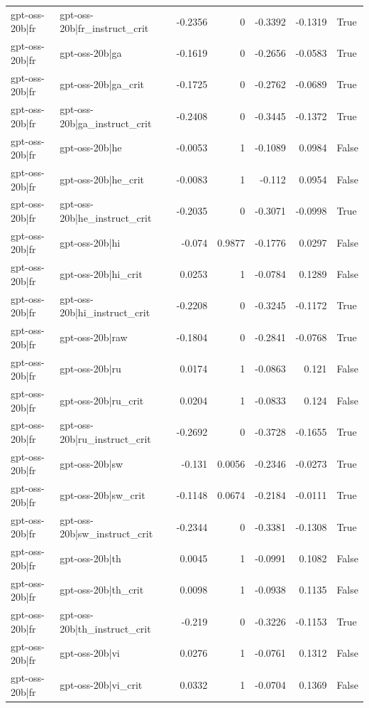 \begin{table}
\begin{tabular}{l l r r r r l}
gpt-oss-20b|fr & gpt-oss-20b|fr_instruct_crit & -0.2356 & 0 & -0.3392 & -0.1319 & True \\
gpt-oss-20b|fr & gpt-oss-20b|ga & -0.1619 & 0 & -0.2656 & -0.0583 & True \\
gpt-oss-20b|fr & gpt-oss-20b|ga_crit & -0.1725 & 0 & -0.2762 & -0.0689 & True \\
gpt-oss-20b|fr & gpt-oss-20b|ga_instruct_crit & -0.2408 & 0 & -0.3445 & -0.1372 & True \\
gpt-oss-20b|fr & gpt-oss-20b|he & -0.0053 & 1 & -0.1089 & 0.0984 & False \\
gpt-oss-20b|fr & gpt-oss-20b|he_crit & -0.0083 & 1 & -0.112 & 0.0954 & False \\
gpt-oss-20b|fr & gpt-oss-20b|he_instruct_crit & -0.2035 & 0 & -0.3071 & -0.0998 & True \\
gpt-oss-20b|fr & gpt-oss-20b|hi & -0.074 & 0.9877 & -0.1776 & 0.0297 & False \\
gpt-oss-20b|fr & gpt-oss-20b|hi_crit & 0.0253 & 1 & -0.0784 & 0.1289 & False \\
gpt-oss-20b|fr & gpt-oss-20b|hi_instruct_crit & -0.2208 & 0 & -0.3245 & -0.1172 & True \\
gpt-oss-20b|fr & gpt-oss-20b|raw & -0.1804 & 0 & -0.2841 & -0.0768 & True \\
gpt-oss-20b|fr & gpt-oss-20b|ru & 0.0174 & 1 & -0.0863 & 0.121 & False \\
gpt-oss-20b|fr & gpt-oss-20b|ru_crit & 0.0204 & 1 & -0.0833 & 0.124 & False \\
gpt-oss-20b|fr & gpt-oss-20b|ru_instruct_crit & -0.2692 & 0 & -0.3728 & -0.1655 & True \\
gpt-oss-20b|fr & gpt-oss-20b|sw & -0.131 & 0.0056 & -0.2346 & -0.0273 & True \\
gpt-oss-20b|fr & gpt-oss-20b|sw_crit & -0.1148 & 0.0674 & -0.2184 & -0.0111 & True \\
gpt-oss-20b|fr & gpt-oss-20b|sw_instruct_crit & -0.2344 & 0 & -0.3381 & -0.1308 & True \\
gpt-oss-20b|fr & gpt-oss-20b|th & 0.0045 & 1 & -0.0991 & 0.1082 & False \\
gpt-oss-20b|fr & gpt-oss-20b|th_crit & 0.0098 & 1 & -0.0938 & 0.1135 & False \\
gpt-oss-20b|fr & gpt-oss-20b|th_instruct_crit & -0.219 & 0 & -0.3226 & -0.1153 & True \\
gpt-oss-20b|fr & gpt-oss-20b|vi & 0.0276 & 1 & -0.0761 & 0.1312 & False \\
gpt-oss-20b|fr & gpt-oss-20b|vi_crit & 0.0332 & 1 & -0.0704 & 0.1369 & False \\

\end{tabular}
\end{table}
